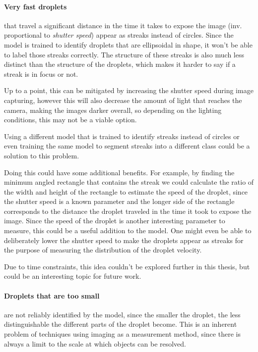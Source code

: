\paragraph{Very fast droplets} that travel a significant distance in the time it takes to expose the image (inv. proportional to \emph{shutter speed}) appear as streaks instead of circles. 
Since the model is trained to identify droplets that are ellipsoidal in shape, it won't be able to label those streaks correctly.
The structure of these streaks is also much less distinct than the structure of the droplets, which makes it harder to say if a streak is in focus or not.

Up to a point, this can be mitigated by increasing the shutter speed during image capturing, however this will also decrease the amount of light that reaches the camera, making the images darker overall, so depending on the lighting conditions, this may not be a viable option.

Using a different model that is trained to identify streaks instead of circles or even training the same model to segment streaks into a different class could be a solution to this problem. 

Doing this could have some additional benefits.
For example, by finding the minimum angled rectangle that contains the streak we could calculate the ratio of the width and height of the rectangle to estimate the speed of the droplet, since the shutter speed is a known parameter and the longer side of the rectangle corresponds to the distance the droplet traveled in the time it took to expose the image.
Since the speed of the droplet is another interesting parameter to measure, this could be a useful addition to the model.
One might even be able to deliberately lower the shutter speed to make the droplets appear as streaks for the purpose of measuring the distribution of the droplet velocity.

Due to time constraints, this idea couldn't be explored further in this thesis, but could be an interesting topic for future work.

\paragraph{Droplets that are too small} are not reliably identified by the model, since the smaller the droplet, the less distinguishable the different parts of the droplet become. 
This is an inherent problem of techniques using imaging as a measurement method, since there is always a limit to the scale at which objects can be resolved.

